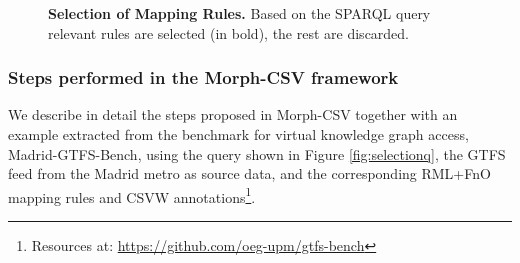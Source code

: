 \begin{figure}[th]
  \centering
\caption[Selection of mapping rules]{\textbf{Selection of Mapping Rules.} Based on the SPARQL query relevant rules are selected (in bold), the rest are discarded.}
\label{fig:selection}
\end{figure}

\subsubsection{Steps performed in the Morph-CSV framework}
We describe in detail the steps proposed in Morph-CSV together with an example extracted from the benchmark for virtual knowledge graph access, Madrid-GTFS-Bench, using the query shown in Figure \ref{fig:selectionq}, the GTFS feed from the  Madrid metro as source data, and the corresponding RML+FnO mapping rules and CSVW annotations\footnote{Resources at: \url{https://github.com/oeg-upm/gtfs-bench}}.


